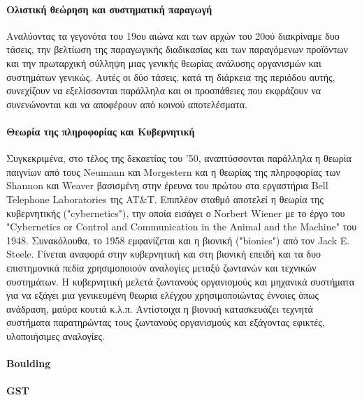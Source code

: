 \documentclass[a4paper,12pt,twoside]{report}
\begin{document}
{			\paragraph{Ολιστική θεώρηση και συστηματική παραγωγή}{Αναλύοντας τα γεγονότα του 19ου αιώνα και των αρχών του 20ού διακρίναμε δυο τάσεις, την βελτίωση της παραγωγικής διαδικασίας και των παραγόμενων προϊόντων και την πρωταρχική σύλληψη μιας γενικής θεωρίας ανάλυσης οργανισμών και συστημάτων γενικώς. Αυτές οι δύο τάσεις, κατά τη διάρκεια της περιόδου αυτής, συνεχίζουν να εξελίσσονται παράλληλα και οι προσπάθειες που εκφράζουν να συνενώνονται και να αποφέρουν από κοινού αποτελέσματα.
			}
			\paragraph{Θεωρία της πληροφορίας και Κυβερνητική}{Συγκεκριμένα, στο τέλος της δεκαετίας του '50, αναπτύσσονται παράλληλα η θεωρία παιγνίων από τους Neumann και Morgestern και η θεωρίας της πληροφορίας των Shannon και Weaver βασισμένη στην έρευνα του πρώτου στα εργαστήρια Bell Telephone Laboratories της AT{\&}T. Επιπλέον σταθμό αποτελεί η θεωρία της κυβερνητικής ("cybernetics"), την οποία εισάγει ο Norbert Wiener με το έργο του "Cybernetics or Control and Communication in the Animal and the Machine" του 1948. Συνακόλουθα, το 1958 εμφανίζεται και η βιονική ("bionics") από τον Jack E. Steele. Γίνεται αναφορά στην κυβερνητική και στη βιονική επειδή και τα δυο επιστημονικά πεδία χρησιμοποιούν αναλογίες μεταξύ ζωντανών και τεχνικών συστημάτων. Η κυβερνητική  μελετά ζωντανούς οργανισμούς και μηχανικά συστήματα για να εξάγει μια γενικευμένη θεωρια ελέγχου χρησιμοποιώντας έννοιες όπως ανάδραση, μαύρα κουτιά κ.λ.π. Αντίστοιχα η βιονική κατασκευάζει τεχνητά συστήματα παρατηρώντας τους ζωντανούς οργανισμούς και εξάγοντας εφικτές, υλοποιήσιμες αναλογίες.
			}
			\paragraph{Boulding}{
			}
			\paragraph{GST}{
			}
			\paragraph{}{
			}
}
\end{document}
